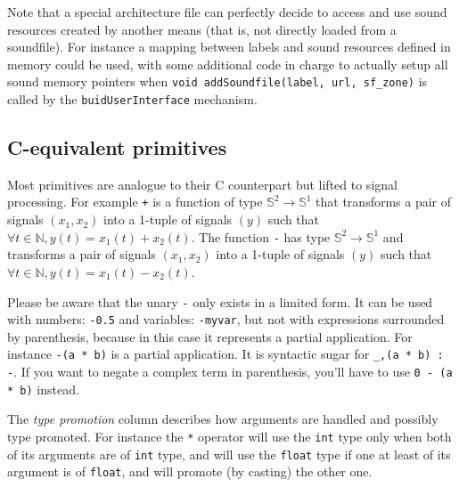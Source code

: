 Note that a special architecture file can perfectly decide to access and use sound resources created by another means (that is, not directly loaded from a soundfile). For instance a mapping between labels and sound resources defined in memory could be used, with some additional code in charge to actually setup all sound memory pointers when \lstinline'void addSoundfile(label, url, sf_zone)' is called by the \lstinline'buidUserInterface' mechanism.

\subsection{C-equivalent primitives}

Most \faust primitives are analogue to their C counterpart but lifted to signal processing.
For example \lstinline|+| is a function of type $\mathbb{S}^{2}\rightarrow\mathbb{S}^{1}$ that transforms a pair of signals $(x_1,x_2)$ into a 1-tuple of signals $(y)$ such that $\forall t\in\mathbb{N}, y(t)=x_{1}(t)+x_{2}(t)$. The function \lstinline|-| has type $\mathbb{S}^{2}\rightarrow\mathbb{S}^{1}$ and transforms a pair of signals $(x_1,x_2)$ into a 1-tuple of signals $(y)$ such that $\forall t\in\mathbb{N}, y(t)=x_{1}(t)-x_{2}(t)$. 

Please be aware that the unary \lstinline|-| only exists in a limited form. It can be used with numbers: \lstinline|-0.5| and variables: \lstinline|-myvar|, but not with expressions surrounded by parenthesis, because in this case it represents a partial application.  For instance   \lstinline|-(a * b)| is a partial application. It is syntactic sugar for \lstinline|_,(a * b) : -|. If you want to negate a complex term in parenthesis, you'll have to use \lstinline|0 - (a * b)| instead.

The \textit{type promotion} column describes how arguments are handled and possibly type promoted. For instance the \texttt{*} operator will use the \texttt{int} type only when both of its arguments are of  \texttt{int} type, and will use the \texttt{float} type if one at least of its argument is of  \texttt{float}, and will promote (by casting) the other one.

\bigskip

